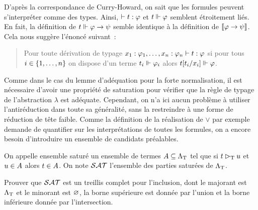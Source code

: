 D'après la correspondance de Curry-Howard, on sait que les formules peuvent
s'interpréter comme des types. Ainsi, $\mathrel{\vdash} t : \varphi$ et
$t\Vdash \varphi$ semblent étroitement liés. En fait, la définition de
$t\Vdash \varphi \to \psi$ semble identique à la définition de
$\llbracket\varphi\to\psi\rrbracket$. Cela nous suggère l'énoncé suivant~:
\begin{quotation}
  \noindent
  Pour toute dérivation de typage
  $x_1:\varphi_1,\ldots,x_n:\varphi_n\mathrel{\vdash} t : \varphi$ si pour tous
  $i \in\{1,\ldots,n\}$ on dispose d'un terme $t_i \Vdash \varphi_i$ alors
  $t[t_i/x_i] \Vdash \varphi$.
\end{quotation}
Comme dans le cas du lemme d'adéquation pour la forte normalisation, il est
nécessaire d'avoir une propriété de saturation pour vérifier que la règle
de typage de l'abstraction $\lambda$ est adéquate. Cependant, on n'a ici aucun
problème à utiliser l'antiréduction dans toute sa généralité, sans la
restreindre à une forme de réduction de tête faible. Comme la définition de la
réalisation de $\lor$ par exemple demande de quantifier sur les interprétations
de toutes les formules, on a encore besoin d'introduire un ensemble de candidats
préalables.

\begin{definition}
  On appelle ensemble saturé un ensemble de termes $A \subseteq \Lambda_{\mathrm{T}}$
  tel que si $t \rhd_{\mathrm{T}} u$ et $u \in A$ alors $t \in A$. On note
  $\mathcal{SAT}$ l'ensemble des parties saturées de $\Lambda_{\mathrm{T}}$.
\end{definition}

\begin{exercise}
  Prouver que $\mathcal{SAT}$ est un treillis complet pour l'inclusion, dont le
  majorant est $\Lambda_{\mathrm{T}}$ et le minorant est $\varnothing$, la borne supérieure
  est donnée par l'union et la borne inférieure donnée par l'intersection.
\end{exercise}


